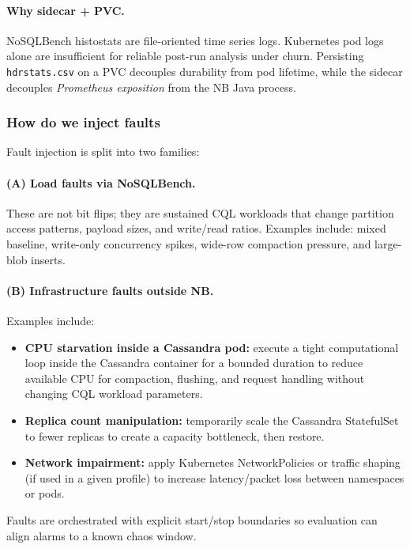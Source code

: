 \documentclass[sigconf]{acmart}
\begin{document}
\paragraph{Why sidecar + PVC.}
NoSQLBench histostats are file-oriented time series logs. Kubernetes pod logs alone are insufficient for reliable post-run analysis under churn. Persisting \texttt{hdrstats.csv} on a PVC decouples durability from pod lifetime, while the sidecar decouples \emph{Prometheus exposition} from the NB Java process.

%
\subsubsection{How do we inject faults}
\label{subsubsec:faults}

Fault injection is split into two families:

\paragraph{(A) Load faults via NoSQLBench.}
These are not bit flips; they are sustained CQL workloads that change partition access patterns, payload sizes, and write/read ratios. Examples include: mixed baseline, write-only concurrency spikes, wide-row compaction pressure, and large-blob inserts.

\paragraph{(B) Infrastructure faults outside NB.}
Examples include:
\begin{itemize}
  \item \textbf{CPU starvation inside a Cassandra pod:} execute a tight computational loop inside the Cassandra container for a bounded duration to reduce available CPU for compaction, flushing, and request handling without changing CQL workload parameters.
  \item \textbf{Replica count manipulation:} temporarily scale the Cassandra StatefulSet to fewer replicas to create a capacity bottleneck, then restore.
  \item \textbf{Network impairment:} apply Kubernetes NetworkPolicies or traffic shaping (if used in a given profile) to increase latency/packet loss between namespaces or pods.
\end{itemize}

Faults are orchestrated with explicit start/stop boundaries so evaluation can align alarms to a known chaos window.
\end{document}

